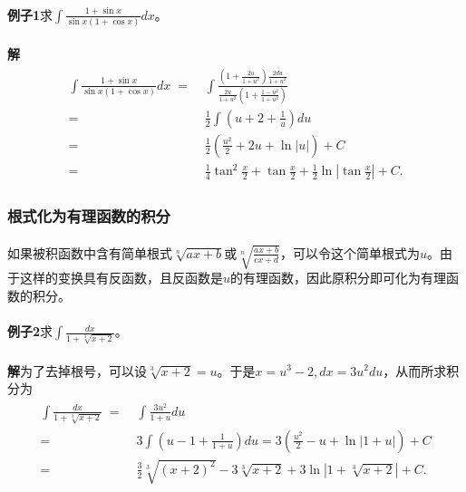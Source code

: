\paragraph{}
\textbf{例子1\;}求$\displaystyle\int \frac{1+\sin x}{\sin x(1+\cos x)}dx$。

\paragraph{}
\textbf{解\;}
\begin{align*}
\begin{split}
  \int\frac{1+\sin x}{\sin x(1+\cos x)}dx \;=&\; \int\frac{(1+\frac{2u}{1+u^2})\frac{2du}{1+u^2}}{\frac{2u}{1+u^2}(1+\frac{1-u^2}{1+u^2})} \\
  =&\; \frac{1}{2}\int(u+2+\frac{1}{u})du \\
  =&\; \frac{1}{2}(\frac{u^2}{2}+2u+\ln|u|) + C \\
  =&\; \frac{1}{4}\tan^2\frac{x}{2} + \tan\frac{x}{2}+\frac{1}{2}\ln|\tan\frac{x}{2}|+C.
\end{split}
\end{align*}

\subsubsection{根式化为有理函数的积分}
\paragraph{}
如果被积函数中含有简单根式$\sqrt[n]{ax+b}$或$\displaystyle\sqrt[n]{\frac{ax+b}{cx+d}}$，可以令这个简单根式为$u$。由于这样的变换具有反函数，且反函数是$u$的有理函数，因此原积分即可化为有理函数的积分。

\paragraph{}
\textbf{例子2\;}求$\displaystyle\int \frac{dx}{1+\sqrt[3]{x+2}}$。

\paragraph{}
\textbf{解\;}为了去掉根号，可以设$\sqrt[3]{x+2} = u$。于是$x=u^3-2, dx = 3u^2du$，从而所求积分为
\begin{align*}
\begin{split}
  \int \frac{dx}{1+\sqrt[3]{x+2}} \;=&\; \int \frac{3u^2}{1+u}du \\
  =&\; 3\int(u-1+\frac{1}{1+u})du = 3(\frac{u^2}{2} - u + \ln|1+u|) + C \\
  =&\; \frac{3}{2}\sqrt[3]{(x+2)^2} - 3\sqrt[3]{x+2} + 3\ln|1+\sqrt[3]{x+2}| + C.
\end{split}
\end{align*}

